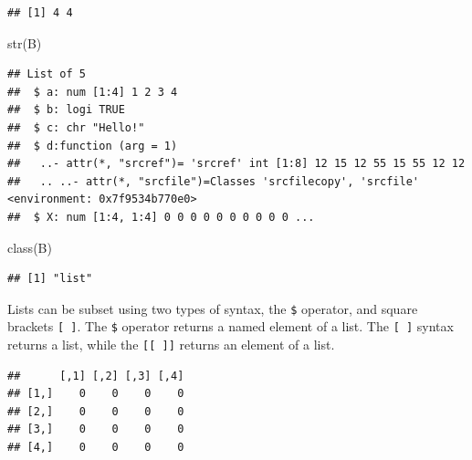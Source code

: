 \documentclass[
]{book}
\newenvironment{Shaded}{\begin{snugshade}}{\end{snugshade}}
\newcommand{\CommentTok}[1]{\textcolor[rgb]{0.56,0.35,0.01}{\textit{#1}}}
\newcommand{\FunctionTok}[1]{\textcolor[rgb]{0.00,0.00,0.00}{#1}}
\newcommand{\NormalTok}[1]{#1}
\newcommand{\SpecialCharTok}[1]{\textcolor[rgb]{0.00,0.00,0.00}{#1}}
\begin{document}
\begin{Shaded}
\end{Shaded}

\begin{verbatim}
## [1] 4 4
\end{verbatim}

\begin{Shaded}
\begin{Highlighting}[]
\FunctionTok{str}\NormalTok{(B)}
\end{Highlighting}
\end{Shaded}

\begin{verbatim}
## List of 5
##  $ a: num [1:4] 1 2 3 4
##  $ b: logi TRUE
##  $ c: chr "Hello!"
##  $ d:function (arg = 1)  
##   ..- attr(*, "srcref")= 'srcref' int [1:8] 12 15 12 55 15 55 12 12
##   .. ..- attr(*, "srcfile")=Classes 'srcfilecopy', 'srcfile' <environment: 0x7f9534b770e0> 
##  $ X: num [1:4, 1:4] 0 0 0 0 0 0 0 0 0 0 ...
\end{verbatim}

\begin{Shaded}
\begin{Highlighting}[]
\FunctionTok{class}\NormalTok{(B)}
\end{Highlighting}
\end{Shaded}

\begin{verbatim}
## [1] "list"
\end{verbatim}

Lists can be subset using two types of syntax, the \texttt{\$} operator, and square brackets \texttt{{[}\ {]}}. The \texttt{\$} operator returns a named element of a list. The \texttt{{[}\ {]}} syntax returns a list, while the \texttt{{[}{[}\ {]}{]}} returns an element of a list.

\begin{Shaded}
\end{Shaded}

\begin{verbatim}
##      [,1] [,2] [,3] [,4]
## [1,]    0    0    0    0
## [2,]    0    0    0    0
## [3,]    0    0    0    0
## [4,]    0    0    0    0
\end{verbatim}
\end{document}
